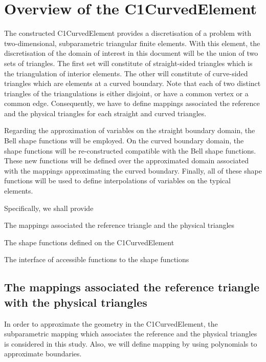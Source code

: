  

\hypertarget{index_overview}{}\section{Overview of the C1\+Curved\+Element}\label{index_overview}
The constructed {\ttfamily C1\+Curved\+Element} provides a discretisation of a problem with two-\/dimensional, subparametric triangular finite elements. With this element, the discretisation of the domain of interest in this document will be the union of two sets of triangles. The first set will constitute of straight-\/sided triangles which is the triangulation of interior elements. The other will constitute of curve-\/sided triangles which are elements at a curved boundary. Note that each of two distinct triangles of the triangulations is either disjoint, or have a common vertex or a common edge. Consequently, we have to define mappings associated the reference and the physical triangles for each straight and curved triangles.

Regarding the approximation of variables on the straight boundary domain, the Bell shape functions will be employed. On the curved boundary domain, the shape functions will be re-\/constructed compatible with the Bell shape functions. These new functions will be defined over the approximated domain associated with the mappings approximating the curved boundary. Finally, all of these shape functions will be used to define interpolations of variables on the typical elements.

Specifically, we shall provide
\begin{DoxyItemize}
\item The mappings associated the reference triangle and the physical triangles
\item The shape functions defined on the {\ttfamily C1\+Curved\+Element} 
\item The interface of accessible functions to the shape functions
\end{DoxyItemize}\hypertarget{index_mapping}{}\subsection{The mappings associated the reference triangle with the physical triangles}\label{index_mapping}
In order to approximate the geometry in the {\ttfamily C1\+Curved\+Element}, the subparametric mapping which associates the reference and the physical triangles is considered in this study. Also, we will define mapping by using polynomials to approximate boundaries.

